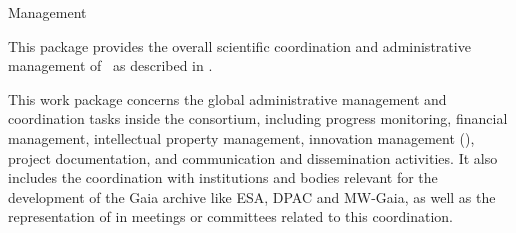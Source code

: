 
\begin{workpackage}{Management}
  \label{wp:management} %

  \wpend{\duration} %


  \makewptable %

  \begin{wpobjectives}
    This package provides the overall scientific coordination and administrative management of \acro\ as described in .
  \end{wpobjectives}

  \begin{wpdescription}

    This work package concerns the global administrative management and coordination tasks inside the consortium, including progress monitoring, financial management, intellectual property management, innovation management (), project documentation, and communication and dissemination activities. It also includes the coordination with institutions and bodies relevant for the development of the Gaia archive like ESA, DPAC and MW-Gaia, as well as the representation of {\acro} in meetings or committees related to this coordination.

\end{wpdescription}
\end{workpackage}
